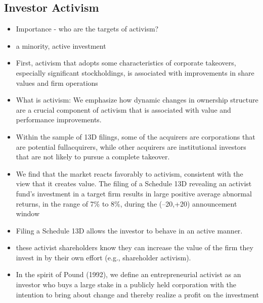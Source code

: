 \documentclass[12pt]{article}
\begin{document}
\subsection{Investor Activism}

    \begin{itemize}
        
        \item Importance - who are the targets of activism? \citep{CoffeeJr.2014}

        \item a minority, active investment \citep{Damodaran2005}
         
        \item First, activism that adopts some characteristics of corporate takeovers, especially significant stockholdings, is associated with improvements in share values and firm operations \citep{Denes2017}

        \item What is activism:  We emphasize how dynamic changes in ownership structure are a crucial component of activism that is associated with value and performance improvements.\citep{Denes2017}

        \item Within the sample of 13D filings, some of the acquirers are corporations that are potential fullacquirers, while other acquirers are institutional investors that are not likely to pursue a complete takeover. \citep{Brigida2012}

        \item We find that the market reacts favorably to activism, consistent with the view that it creates value. The filing of a Schedule 13D revealing an activist fund’s investment in a target firm results in large positive average abnormal returns, in the range of 7\% to 8\%, during the (–20,+20) announcement window \citep{Brav2008}

        \item Filing a Schedule 13D allows the investor to behave in an active manner. \citep{Brigida2012}

        \item these activist shareholders know they can increase the value of the firm they invest in by their own effort (e.g., shareholder activism).\citep{Collin-Dufresne2015}

        \item In the spirit of Pound (1992), we define an entrepreneurial activist as an investor who buys a large stake in a publicly held corporation with the intention to bring about change and thereby realize a profit on the investment \citep{Klein2009}


\end{itemize}
\end{document}
